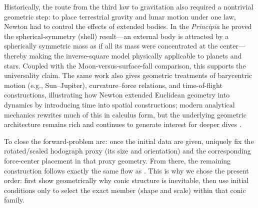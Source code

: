 Historically, the route from the third law to gravitation also required a nontrivial geometric step: to place terrestrial gravity and lunar motion under one law, Newton had to control the effects of extended bodies. In the \emph{Principia} he proved the spherical-symmetry (shell) result---an external body is attracted by a spherically symmetric mass as if all its mass were concentrated at the center---thereby making the inverse-square model physically applicable to planets and stars. Coupled with the Moon-versus-surface-fall comparison, this supports the universality claim. The same work also gives geometric treatments of barycentric motion (e.g., Sun--Jupiter), curvature--force relations, and time-of-flight constructions, illustrating how Newton extended Euclidean geometry into dynamics by introducing time into spatial constructions; modern analytical mechanics rewrites much of this in calculus form, but the underlying geometric architecture remains rich and continues to generate interest for deeper dives \cite{newton1687principia,newton1846mottewikisource,newton1934mottecajori,chandrasekhar1995principia,markowsky2011newton}.

To close the forward-problem arc: once the initial data are given,  uniquely fix the rotated/scaled hodograph proxy (its size and orientation) and the corresponding force-center placement in that proxy geometry. From there, the remaining construction follows exactly the same flow as . This is why we chose the present order: first show geometrically why conic structure is inevitable, then use initial conditions only to select the exact member (shape and scale) within that conic family.
